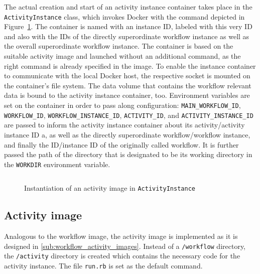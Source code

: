     The actual creation and start of an activity instance container takes place in the \texttt{ActivityInstance} class, which invokes Docker with the command depicted in Figure~\ref{fig:instantiation_of_an_activity_image_in_activityinstance}. The container is named with an instance \ac{ID}, labeled with this very \ac{ID} and also with the \acp{ID} of the directly superordinate workflow instance as well as the overall superordinate workflow instance. The container is based on the suitable activity image and launched without an additional command, as the right command is already specified in the image. To enable the instance container to communicate with the local Docker host, the respective socket is mounted on the container's file system. The data volume that contains the workflow relevant data is bound to the activity instance container, too. Environment variables are set on the container in order to pass along configuration: \texttt{MAIN\_WORKFLOW\_ID}, \texttt{WORKFLOW\_ID}, \texttt{WORKFLOW\_INSTANCE\_ID}, \texttt{ACTIVITY\_ID}, and \texttt{ACTIVITY\_INSTANCE\_ID} are passed to inform the activity instance container about its activity/activity instance \ac{ID} a, as well as the directly superordinate workflow/workflow instance, and finally the \ac{ID}/instance \ac{ID} of the originally called workflow. It is further passed the path of the directory that is designated to be its working directory in the \texttt{WORKDIR} environment variable.

    \begin{figure}[htbp]
      \inputminted[firstline=40,lastline=68,fontsize=\footnotesize,linenos=true,numberblanklines=true,showspaces=false,breaklines=true,baselinestretch=1,gobble=2]{ruby}{../code/wf_base/activity_instance.rb}
      \caption[Instantiation of an activity image in ActivityInstance]{Instantiation of an activity image in \texttt{ActivityInstance}}
      \label{fig:instantiation_of_an_activity_image_in_activityinstance}
    \end{figure}


  \subsection{Activity image} %
  \label{sub:activity_containers}
    Analogous to the workflow image, the activity image is implemented as it is designed in \ref{sub:workflow_activity_images}. Instead of a \texttt{/workflow} directory, the \texttt{/activity} directory is created which contains the necessary code for the activity instance. The file \texttt{run.rb} is set as the default command.

